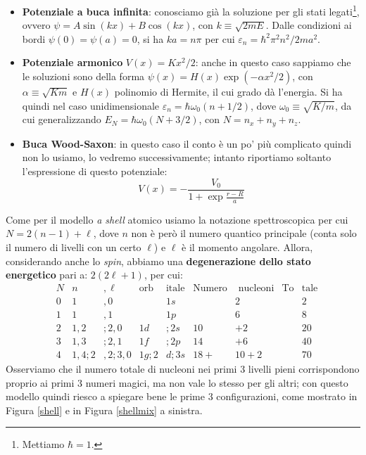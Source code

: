 \begin{itemize}
    \item \textbf{Potenziale a buca infinita}: conosciamo già la soluzione per gli stati legati\footnote{Mettiamo $\hbar=1$.}, ovvero $\psi = A \sin (kx) + B \cos (kx)$, con $k\equiv \sqrt{2mE}$. Dalle condizioni ai bordi $\psi(0)=\psi(a)=0$, si ha $ka = n\pi$ per cui $\varepsilon_n = \hbar^2 \pi^2  n^2 / 2ma^2$.
    \item \textbf{Potenziale armonico} $V(x)=Kx^2/2$: anche in questo caso sappiamo che le soluzioni sono della forma $\psi(x) = H(x)\exp{(-\alpha x^2/2)}$, con $\alpha \equiv \sqrt{Km}$ e $H(x)$ polinomio di Hermite, il cui grado dà l'energia. Si ha quindi nel caso unidimensionale $\varepsilon_n = \hbar \omega_0 (n+1/2)$, dove $\omega_0 \equiv \sqrt{K/m}$, da cui generalizzando $E_N= \hbar \omega_0 (N+3/2)$, con $N= n_x+n_y+n_z$.
    \item \textbf{Buca Wood-Saxon}: in questo caso il conto è un po' più complicato quindi non lo usiamo, lo vedremo successivamente; intanto riportiamo soltanto l'espressione di questo potenziale:
    $$V(x) = - \frac{V_0}{1+\exp{\frac{r-R}{a}}}$$
\end{itemize}
\noindent Come per il modello \textit{a shell} atomico usiamo la notazione spettroscopica per cui $N = 2(n-1)+\ell$, dove $n$ non è però il numero quantico principale (conta solo il numero di livelli con un certo $\ell$) e $\ell$ è il momento angolare. Allora, considerando anche lo \textit{spin}, abbiamo una \textbf{degenerazione dello stato energetico} pari a: $2(2\ell+1)$, per cui:
\begin{displaymath}
\begin{aligned}
&N & n&,\ell & \text{orb}&\text{itale} & \text{Numero}&\text{ nucleoni} & \text{To}&\text{tale}\\
&0 & 1&,0 & &1s & &2 & &2   \\
&1 & 1&,1 & &1p & &6 & &8   \\
&2 & 1,2&;2,0 & 1d&;2s & 10&+2 & &20 \\
&3 & 1,3&;2,1 & 1f&;2p & 14&+6 & &40   \\
&4 & 1,4;2&,2;3,0 & 1g;2&d;3s & 18+&10+2 & &70
\end{aligned}
\end{displaymath}
Osserviamo che il numero totale di nucleoni nei primi 3 livelli pieni corrispondono proprio ai primi 3 numeri magici, ma non vale lo stesso per gli altri; con questo modello quindi riesco a spiegare bene le prime 3 configurazioni, come mostrato in Figura \ref{shell} e in Figura \ref{shellmix} a sinistra.
